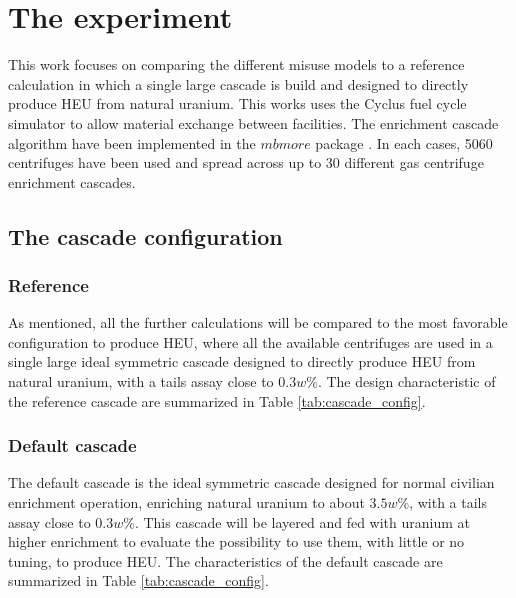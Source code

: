 \section{The experiment}
This work focuses on comparing the different misuse models to a reference
calculation in which a single large cascade is build and designed to directly
produce \gls{HEU} from natural uranium.
This works uses the Cyclus fuel cycle simulator to allow material exchange
between facilities. The enrichment cascade algorithm have been implemented in
the $mbmore$ package \cite{mbmore.2018}.
In each cases, 5060 centrifuges have been used and spread across up to 30
different gas centrifuge enrichment cascades. 


\subsection{The cascade configuration}

\subsubsection{Reference}

As mentioned, all the further calculations will be compared to the most
favorable configuration to produce \gls{HEU}, where all the available
centrifuges are used in a single large ideal symmetric cascade designed to
directly produce \gls{HEU} from natural uranium, with a tails assay close to
$0.3w\%$. The design characteristic of the reference cascade are summarized in
Table \ref{tab:cascade_config}.

\subsubsection{Default cascade}

The default cascade is the ideal symmetric cascade designed for normal civilian
enrichment operation, enriching natural uranium to about $3.5w\%$, with a tails
assay close to $0.3w\%$. This cascade will be layered and fed with uranium at
higher enrichment to evaluate the possibility to use them, with little or no
tuning, to produce \gls{HEU}. The characteristics of the default cascade are
summarized in Table \ref{tab:cascade_config}.

